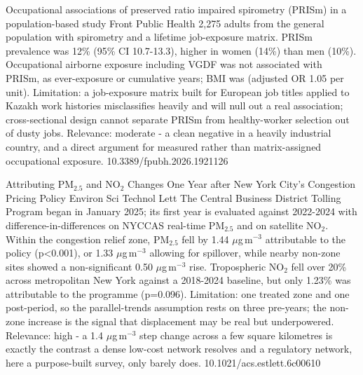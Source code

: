 \documentclass[10pt]{article}
\begin{document}
\par{}\baselineskip{}\baselineskip
{}

{Occupational associations of preserved ratio impaired spirometry (PRISm) in a population-based study}
{Front Public Health}
{2,275 adults from the general population with spirometry and a lifetime job-exposure matrix. PRISm prevalence was 12\% (95\% CI 10.7-13.3), higher in women (14\%) than men (10\%). Occupational airborne exposure including VGDF was not associated with PRISm, as ever-exposure or cumulative years; BMI was (adjusted OR 1.05 per unit). Limitation: a job-exposure matrix built for European job titles applied to Kazakh work histories misclassifies heavily and will null out a real association; cross-sectional design cannot separate PRISm from healthy-worker selection out of dusty jobs. Relevance: moderate - a clean negative in a heavily industrial country, and a direct argument for measured rather than matrix-assigned occupational exposure.}
{10.3389/fpubh.2026.1921126}

\par{}\baselineskip{}\baselineskip
{}

{Attributing PM$_{2.5}$ and NO$_2$ Changes One Year after New York City's Congestion Pricing Policy}
{Environ Sci Technol Lett}
{The Central Business District Tolling Program began in January 2025; its first year is evaluated against 2022-2024 with difference-in-differences on NYCCAS real-time PM$_{2.5}$ and on satellite NO$_2$. Within the congestion relief zone, PM$_{2.5}$ fell by 1.44 $\mu$g\,m$^{-3}$ attributable to the policy (p<0.001), or 1.33 $\mu$g\,m$^{-3}$ allowing for spillover, while nearby non-zone sites showed a non-significant 0.50 $\mu$g\,m$^{-3}$ rise. Tropospheric NO$_2$ fell over 20\% across metropolitan New York against a 2018-2024 baseline, but only 1.23\% was attributable to the programme (p=0.096). Limitation: one treated zone and one post-period, so the parallel-trends assumption rests on three pre-years; the non-zone increase is the signal that displacement may be real but underpowered. Relevance: high - a 1.4 $\mu$g\,m$^{-3}$ step change across a few square kilometres is exactly the contrast a dense low-cost network resolves and a regulatory network, here a purpose-built survey, only barely does.}
{10.1021/acs.estlett.6c00610}
\end{document}
